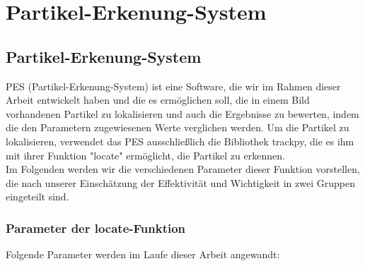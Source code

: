 \chapter{Partikel-Erkenung-System \label{kap3}}

\section{Partikel-Erkenung-System}
PES (Partikel-Erkenung-System)  ist eine Software, die wir im Rahmen dieser Arbeit entwickelt haben und die es ermöglichen soll, die in einem Bild vorhandenen Partikel zu lokalisieren und auch die Ergebnisse zu bewerten, indem die den Parametern zugewiesenen Werte verglichen werden. 
Um die Partikel zu lokalisieren, verwendet das PES ausschließlich die Bibliothek trackpy, die es ihm mit ihrer Funktion "locate" ermöglicht, die Partikel zu erkennen.\\
Im Folgenden werden wir die verschiedenen Parameter dieser Funktion vorstellen, die nach unserer Einschätzung der Effektivität und Wichtigkeit in zwei Gruppen eingeteilt sind.
	\subsection{Parameter der locate-Funktion \label{kap3_param_loacate}}
		Folgende Parameter werden im Laufe dieser Arbeit angewandt:

